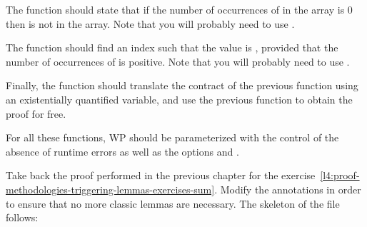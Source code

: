 The function  should state that if the number of
occurrences of  in the array is 0 then  is not in
the array. Note that you will probably need to use .


The function  should find an index 
such that the value  is , provided that the
number of occurrences of  is positive. Note that you will
probably need to use .


Finally, the function  should translate the contract
of the previous function using an existentially quantified variable, and use the
previous function to obtain the proof for free.


For all these functions, WP should be parameterized with the control of the
absence of runtime errors as well as the options
 and .






Take back the proof performed in the previous chapter for the
exercise~\ref{l4:proof-methodologies-triggering-lemmas-exercises-sum}. Modify
the annotations in order to ensure that no more classic lemmas are necessary.
The skeleton of the file follows:




